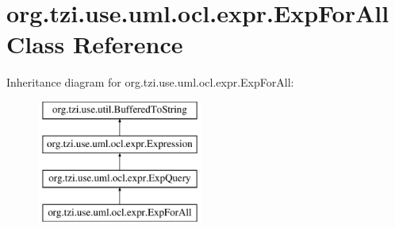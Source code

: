 \hypertarget{classorg_1_1tzi_1_1use_1_1uml_1_1ocl_1_1expr_1_1_exp_for_all}{\section{org.\-tzi.\-use.\-uml.\-ocl.\-expr.\-Exp\-For\-All Class Reference}
\label{classorg_1_1tzi_1_1use_1_1uml_1_1ocl_1_1expr_1_1_exp_for_all}
}
Inheritance diagram for org.\-tzi.\-use.\-uml.\-ocl.\-expr.\-Exp\-For\-All\-:\begin{figure}[H]
\begin{center}
\leavevmode
\includegraphics[height=4.000000cm]{classorg_1_1tzi_1_1use_1_1uml_1_1ocl_1_1expr_1_1_exp_for_all}
\end{center}
\end{figure}
